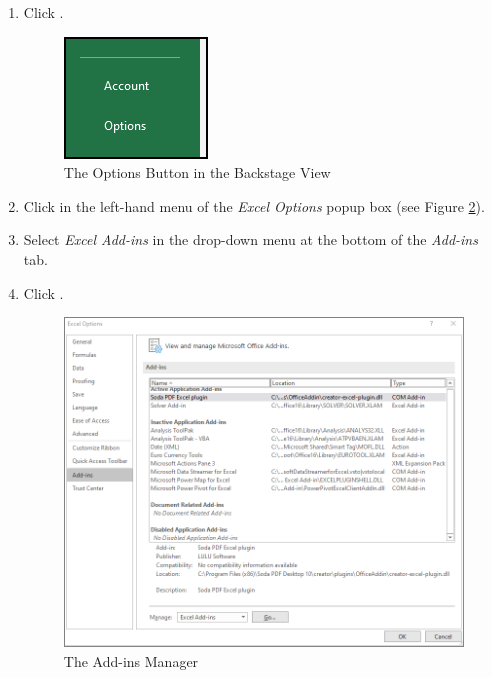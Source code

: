 \begin{enumbox}
	\begin{enumerate}
		\item Click .

		\begin{figure}[H]
			\centering
			\includegraphics[width=\maxwidth{.35\linewidth}]{gfx/ch09_fig50}
			\caption{The Options Button in the Backstage View}
			\label{09:fig50}
		\end{figure}

		\item Click  in the left-hand menu of the \textit{Excel Options} popup box (see Figure \ref{09:fig51}).
		\item Select \textit{Excel Add-ins} in the drop-down menu at the bottom of the \textit{Add-ins} tab.
		\item Click .

		\begin{figure}[H]
			\centering
			\includegraphics[width=\maxwidth{.95\linewidth}]{gfx/ch09_fig51}
			\caption{The Add-ins Manager}
			\label{09:fig51}
		\end{figure}


\end{enumerate}
\end{enumbox}
